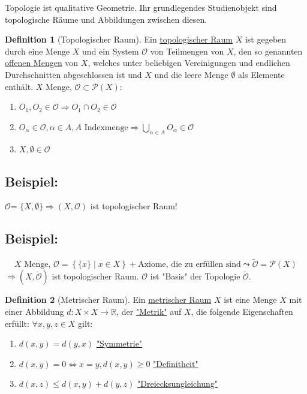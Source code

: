 \documentclass[a4paper,11pt,notitlepage]{report}
\theoremstyle{remark}
\theoremstyle{definition}
\newtheorem{definition}{Definition}[chapter]
\newcommand{\R}{{\ensuremath{\mathbb{R}}}}
\newcommand{\OO}{{\ensuremath{\mathcal{O}}}}
\newenvironment{bsp}[1]
{
\setlength{\fboxsep}{10pt}
\subsection*{Beispiel: #1}
\begin{upshape}
}
{
\end{upshape}
}
\begin{document}
Topologie ist qualitative Geometrie. Ihr grundlegendes Studienobjekt sind topologische Räume und Abbildungen zwischen diesen.

\begin{definition}[Topologischer Raum]
Ein \underline{topologischer Raum} $X$ ist gegeben durch eine Menge $X$ und ein System $\OO$ von Teilmengen von $X$, den so genannten \underline{offenen Mengen} von $X$, welches unter beliebigen Vereinigungen und endlichen Durchschnitten abgeschlossen ist und $X$ und die leere Menge $\emptyset$ als Elemente enthält.
\newline
$X$ Menge, $\OO \subset \mathcal{P}(X) \colon$
\begin{enumerate}[(1)]
	\item $O_1, O_2 \in \OO \Rightarrow O_1 \cap O_2 \in \OO$
	\item $O_\alpha \in \OO, \alpha \in A, A \text{ Indexmenge} \Rightarrow \bigcup\limits_{\alpha \in A}{O_\alpha} \in \OO$
	\item $X, \emptyset \in \OO$
\end{enumerate}
\end{definition}

\begin{bsp}{}
\OO = $\{X, \emptyset\} \Rightarrow (X,\OO)$ ist topologischer Raum!
\end{bsp}

\begin{bsp}{}
$$X \text{ Menge, }\OO = \left\{\{x\} \mid x\in X\right\} + \text{Axiome, die zu erfüllen sind} \leadsto \tilde{\OO} = \mathcal{P}(X)$$
$\Rightarrow (X,\tilde{\OO})$ ist topologischer Raum.
$\OO$ ist "Basis" der Topologie $\tilde{\OO}$.
\end{bsp}

\begin{definition}[Metrischer Raum]
Ein \underline{metrischer Raum} $X$ ist eine Menge $X$ mit einer Abbildung $d \colon X \times X \rightarrow \R$, der \underline{"Metrik"} auf $X$, die folgende Eigenschaften erfüllt:
$\forall x,y,z \in X$ gilt:
\begin{enumerate}[(1)]
	\item $d(x,y) = d(y,x)$ \underline{"Symmetrie"}
	\item $d(x,y) = 0 \Leftrightarrow x = y, d(x,y) \geq 0$ \underline{"Definitheit"}
	\item $d(x,z) \leq d(x,y) + d(y,z)$ \underline{"Dreiecksungleichung"}
\end{enumerate}
\end{definition}
\end{document}

